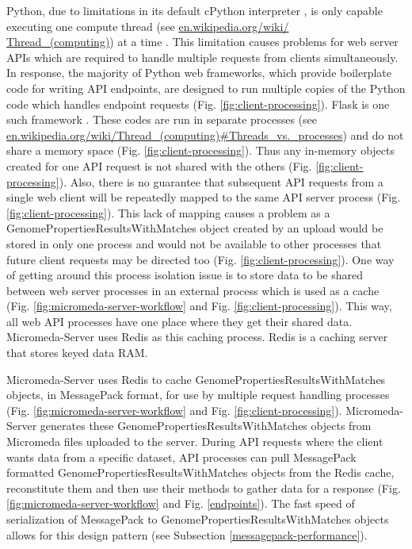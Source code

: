 Python, due to limitations in its default cPython interpreter \cite{van1995python}, is only capable executing one compute thread \cite{saltzer1966traffic} (see \href{en.wikipedia.org/wiki/Thread\_(computing)}{en.wikipedia.org/wiki/ \\ Thread\_(computing)}) at a time \cite{beazley2010understanding}. This limitation causes problems for web server APIs which are required to handle multiple requests from clients simultaneously. In response, the majority of Python web frameworks, which provide boilerplate code for writing API endpoints, are designed to run multiple copies of the Python code which handles endpoint requests (Fig. \ref{fig:client-processing}). Flask is one such framework \cite{grinberg2018flask}. These codes are run in separate processes (see \href{en.wikipedia.org/wiki/Thread\_(computing)\#Threads\_vs.\_processes}{en.wikipedia.org/wiki/Thread\_(computing)\#Threads\_vs.\_processes}) and do not share a memory space (Fig. \ref{fig:client-processing}). Thus any in-memory objects created for one API request is not shared with the others (Fig. \ref{fig:client-processing}). Also, there is no guarantee that subsequent API requests from a single web client will be repeatedly mapped to the same API server process (Fig. \ref{fig:client-processing}). This lack of mapping causes a problem as a GenomePropertiesResultsWithMatches object created by an upload would be stored in only one process and would not be available to other processes that future client requests may be directed too (Fig. \ref{fig:client-processing}). One way of getting around this process isolation issue is to store data to be shared between web server processes in an external process which is used as a cache (Fig. \ref{fig:micromeda-server-workflow} and Fig. \ref{fig:client-processing}). This way, all web API processes have one place where they get their shared data. Micromeda-Server uses Redis as this caching process. Redis is a caching server that stores keyed data RAM. 

Micromeda-Server uses Redis to cache GenomePropertiesResultsWithMatches objects, in MessagePack format, for use by multiple request handling processes (Fig. \ref{fig:micromeda-server-workflow} and Fig. \ref{fig:client-processing}). Micromeda-Server generates these GenomePropertiesResultsWithMatches objects from Micromeda files uploaded to the server. During API requests where the client wants data from a specific dataset, API processes can pull MessagePack formatted GenomePropertiesResultsWithMatches objects from the Redis cache, reconstitute them and then use their methods to gather data for a response (Fig. \ref{fig:micromeda-server-workflow}  and Fig. \ref{endpoints}). The fast speed of serialization of MessagePack to GenomePropertiesResultsWithMatches objects allows for this design pattern (see Subsection \ref{messagepack-performance}).

